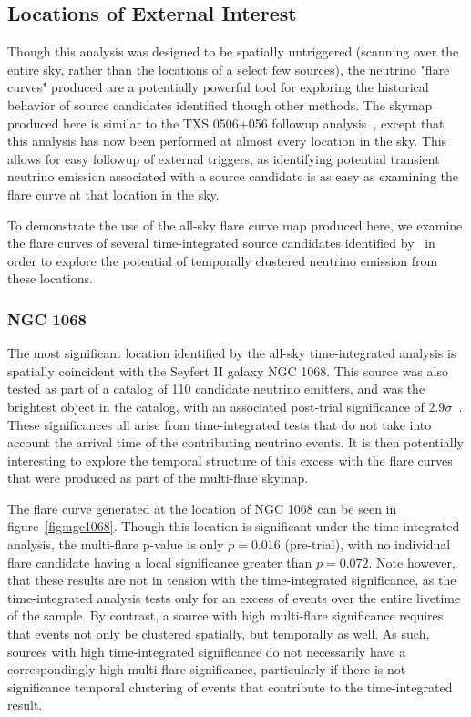 \subsection{Locations of External Interest}
Though this analysis was designed to be spatially untriggered (scanning over the entire sky, rather than the locations of a select few sources), the neutrino "flare curves" produced are a potentially powerful tool for exploring the historical behavior of source candidates identified though other methods. The skymap produced here is similar to the TXS 0506+056 followup analysis~\cite{TXS_Archival}, except that this analysis has now been performed at almost every location in the sky. This allows for easy followup of external triggers, as identifying potential transient neutrino emission associated with a source candidate is as easy as examining the flare curve at that location in the sky. 

To demonstrate the use of the all-sky flare curve map produced here, we examine the flare curves of several time-integrated source candidates identified by~\cite{10yr_tint} in order to explore the potential of temporally clustered neutrino emission from these locations. 

\subsubsection{NGC 1068}

The most significant location identified by the all-sky time-integrated analysis is spatially coincident with the Seyfert II galaxy NGC 1068. This source was also tested as part of a catalog of 110 candidate neutrino emitters, and was the brightest object in the catalog, with an associated post-trial significance of $2.9 \sigma$~\cite{10yr_tint}. These significances all arise from time-integrated tests that do not take into account the arrival time of the contributing neutrino events. It is then potentially interesting to explore the temporal structure of this excess with the flare curves that were produced as part of the multi-flare skymap. 

The flare curve generated at the location of NGC 1068 can be seen in figure~\ref{fig:ngc1068}. Though this location is significant under the time-integrated analysis, the multi-flare p-value is only $p=0.016$ (pre-trial), with no individual flare candidate having a local significance greater than $p=0.072$. Note however, that these results are not in tension with the time-integrated significance, as the time-integrated analysis tests only for an excess of events over the entire livetime of the sample. By contrast, a source with high multi-flare significance requires that events not only be clustered spatially, but temporally as well. As such, sources with high time-integrated significance do not necessarily have a correspondingly high multi-flare significance, particularly if there is not significance temporal clustering of events that contribute to the time-integrated result. 

